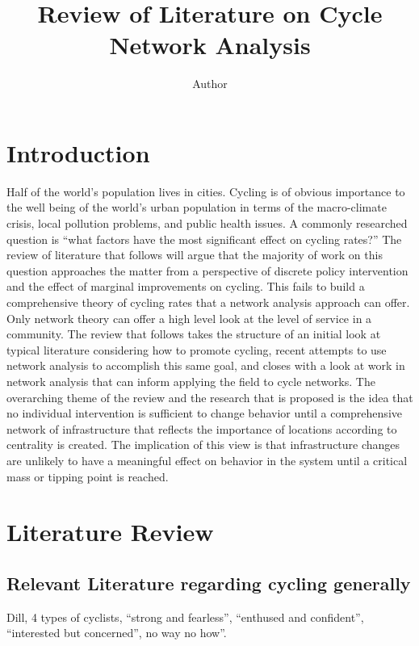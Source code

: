 \documentclass[11pt]{article} %
\title{\vspace{-3.0cm}Review of Literature on Cycle Network Analysis}
\author{Author}
\begin{document}
\maketitle


\section{Introduction}

Half of the world's population lives in cities. Cycling is of obvious importance to the well being of the world's  urban population in terms of the macro-climate crisis, local pollution problems, and public health issues. A commonly researched question is ``what factors have the most significant effect on cycling rates?'' The review of literature that follows will argue that the majority of work on this question approaches the matter from a perspective of discrete policy intervention and the effect of marginal improvements on cycling. This fails to build a comprehensive theory of cycling rates that a network analysis approach can offer. Only network theory can offer a high level look at the level of service in a community. The review that follows takes the structure of an initial look at typical literature considering how to promote cycling, recent attempts to use network analysis to accomplish this same goal, and closes with a look at work in network analysis that can inform applying the field to cycle networks. The overarching theme of the review and the research that is proposed is the idea that no individual intervention is sufficient to change behavior until a comprehensive network of infrastructure that reflects the importance of locations according to centrality is created. The implication of this view is that infrastructure changes are unlikely to have a meaningful effect on behavior in the system until a critical mass or tipping point is reached. 

\section{Literature Review}

\subsection{Relevant Literature regarding cycling generally}

Dill, 4 types of cyclists, ``strong and fearless'', ``enthused and confident'', ``interested but concerned'', no way no how''.   \cite{dill2013four}
\end{document}
